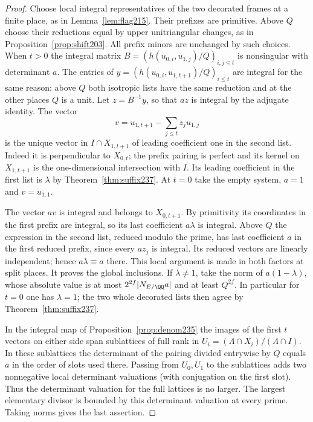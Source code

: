 \documentclass[a4paper,11pt]{article}
\theoremstyle{definition}
\theoremstyle{remark}
\numberwithin{equation}{section}
\begin{document}
\begin{proof}
Choose local integral representatives of the two decorated
frames at a finite place, as in Lemma~\ref{lem:flag215}.
Their prefixes are primitive. Above \(Q\) choose their
reductions equal by upper unitriangular changes, as in
Proposition~\ref{prop:shift203}. All prefix minors are
unchanged by such choices. When \(t>0\) the integral
matrix \(B=(h(u_{0,i},u_{1,j})/Q)_{i,j\le t}\) is nonsingular
with determinant \(a\). The entries of
\(y=(h(u_{0,i},u_{1,t+1})/Q)_{i\le t}\) are integral for
the same reason: above \(Q\) both isotropic lists have the
same reduction and at the other places \(Q\) is a unit.
Let \(z=B^{-1}y\), so that \(az\) is integral by the adjugate
identity. The vector
\[
 v=u_{1,t+1}-\sum_{j\le t}z_j u_{1,j}
\]
is the unique vector in \(I\cap X_{1,t+1}\) of leading
coefficient one in the second list. Indeed it is perpendicular
to \(X_{0,t}\); the prefix pairing is perfect and its kernel
on \(X_{1,t+1}\) is the one-dimensional intersection with \(I\).
Its leading coefficient in the first list is \(\lambda\) by
Theorem~\ref{thm:suffix237}. At \(t=0\) take the empty system,
\(a=1\) and \(v=u_{1,1}\).

The vector \(av\) is integral and belongs to \(X_{0,t+1}\).
By primitivity its coordinates in the first prefix are integral,
so its last coefficient \(a\lambda\) is integral. Above \(Q\)
the expression in the second list, reduced modulo the prime,
has last coefficient \(a\) in the first reduced prefix, since
every \(az_j\) is integral. Its reduced vectors are linearly
independent; hence \(a\lambda\equiv a\) there. This local
argument is made in both factors at split places. It proves
the global inclusions. If \(\lambda\ne1\), take the norm of
\(a(1-\lambda)\), whose absolute value is at most
\(2^{2f}|N_{E/\QQ}a|\) and at least \(Q^{2f}\). In particular
for \(t=0\) one has \(\lambda=1\); the two whole decorated
lists then agree by Theorem~\ref{thm:suffix237}.

In the integral map of Proposition~\ref{prop:denom235} the
images of the first \(t\) vectors on either side span sublattices
of full rank in \(U_i=(\Lambda\cap X_i)/(\Lambda\cap I)\).
In these sublattices the determinant of the pairing divided
entrywise by \(Q\) equals \(\bar a\) in the order of slots
used there. Passing from \(U_0,U_1\) to the sublattices
adds two nonnegative local determinant valuations (with
conjugation on the first slot). Thus the determinant valuation
for the full lattices is no larger. The largest elementary
divisor is bounded by this determinant valuation at every
prime. Taking norms gives the last assertion.
\end{proof}
\end{document}
